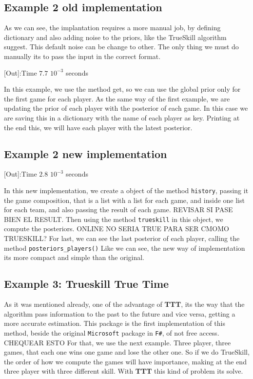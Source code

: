 \documentclass[article]{jss}
\begin{document}
\subsection{Example 2 old implementation}
As we can see, the implantation requires a more manual job, by defining dictionary and also adding noise to the priors, like the TrueSkill algorithm suggest. This default noise can be change to other. 
The only thing we must do manually its to pass the input in the correct format.

[Out]:Time $7.7$ $10^{-3}$ seconds

In this example, we use the method get, so we can use the global prior only for the first game for each player.
As the same way of the first example, we are updating the prior of each player with the posterior of each game.
In this case we are saving this in a dictionary with the name of each player as key.
Printing at the end this, we will have each player with the latest posterior.

\subsection{Example 2 new implementation}

[Out]:Time $2.8$ $10^{-3}$ seconds

In this new implementation, we create a object of the method \texttt{history}, passing it the game composition, that is a list with a list for each game, and inside one list for each team, and also passing the result of each game.
REVISAR SI PASE BIEN EL RESULT.
Then using the method \texttt{trueskill} in this object, we compute the posteriors. 
ONLINE NO SERIA TRUE PARA SER CMOMO TRUESKILL?
For last, we can see the last posterior of each player, calling the method \texttt{posteriors\_players()}
Like we can see, the new way of implementation its more compact and simple than the original.


\subsection{Example 3: Trueskill True Time}
As it was mentioned already, one of the advantage of \textbf{TTT}, its the way that the algorithm pass information to the past to the future and vice versa, getting a more accurate estimation.
This package is the first implementation of this method, beside the original \texttt{Microsoft} package in \texttt{F\#}, of not free access. CHEQUEAR ESTO
For that, we use the next example. 
Three player, three games, that each one wins one game and lose the other one. 
So if we do TrueSkill, the order of how we compute the games will have importance, making at the end three player with three different skill. 
With \textbf{TTT} this kind of problem its solve.
\end{document}
